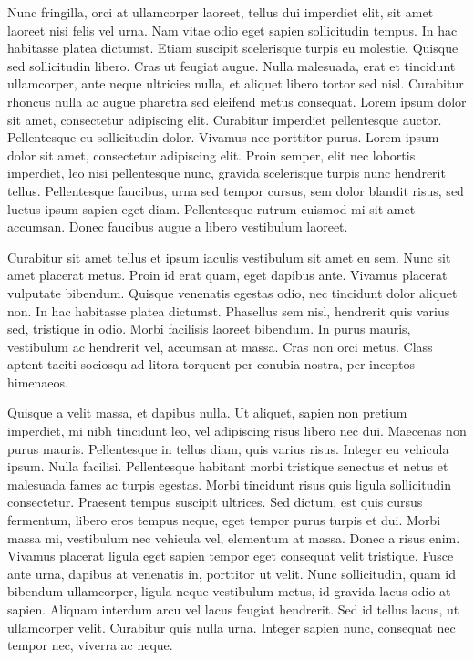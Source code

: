 Nunc fringilla, orci at ullamcorper laoreet, tellus dui imperdiet elit, sit amet laoreet nisi felis vel urna.
Nam vitae odio eget sapien sollicitudin tempus.
In hac habitasse platea dictumst.
Etiam suscipit scelerisque turpis eu molestie.
Quisque sed sollicitudin libero.
Cras ut feugiat augue.
Nulla malesuada, erat et tincidunt ullamcorper, ante neque ultricies nulla, et aliquet libero tortor sed nisl.
Curabitur rhoncus nulla ac augue pharetra sed eleifend metus consequat.
Lorem ipsum dolor sit amet, consectetur adipiscing elit.
Curabitur imperdiet pellentesque auctor.
Pellentesque eu sollicitudin dolor.
Vivamus nec porttitor purus.
Lorem ipsum dolor sit amet, consectetur adipiscing elit.
Proin semper, elit nec lobortis imperdiet, leo nisi pellentesque nunc, gravida scelerisque turpis nunc hendrerit tellus.
Pellentesque faucibus, urna sed tempor cursus, sem dolor blandit risus, sed luctus ipsum sapien eget diam.
Pellentesque rutrum euismod mi sit amet accumsan.
Donec faucibus augue a libero vestibulum laoreet.

Curabitur sit amet tellus et ipsum iaculis vestibulum sit amet eu sem.
Nunc sit amet placerat metus.
Proin id erat quam, eget dapibus ante.
Vivamus placerat vulputate bibendum.
Quisque venenatis egestas odio, nec tincidunt dolor aliquet non.
In hac habitasse platea dictumst.
Phasellus sem nisl, hendrerit quis varius sed, tristique in odio.
Morbi facilisis laoreet bibendum.
In purus mauris, vestibulum ac hendrerit vel, accumsan at massa.
Cras non orci metus.
Class aptent taciti sociosqu ad litora torquent per conubia nostra, per inceptos himenaeos.

Quisque a velit massa, et dapibus nulla.
Ut aliquet, sapien non pretium imperdiet, mi nibh tincidunt leo, vel adipiscing risus libero nec dui.
Maecenas non purus mauris.
Pellentesque in tellus diam, quis varius risus.
Integer eu vehicula ipsum.
Nulla facilisi.
Pellentesque habitant morbi tristique senectus et netus et malesuada fames ac turpis egestas.
Morbi tincidunt risus quis ligula sollicitudin consectetur.
Praesent tempus suscipit ultrices.
Sed dictum, est quis cursus fermentum, libero eros tempus neque, eget tempor purus turpis et dui.
Morbi massa mi, vestibulum nec vehicula vel, elementum at massa.
Donec a risus enim.
Vivamus placerat ligula eget sapien tempor eget consequat velit tristique.
Fusce ante urna, dapibus at venenatis in, porttitor ut velit.
Nunc sollicitudin, quam id bibendum ullamcorper, ligula neque vestibulum metus, id gravida lacus odio at sapien.
Aliquam interdum arcu vel lacus feugiat hendrerit.
Sed id tellus lacus, ut ullamcorper velit.
Curabitur quis nulla urna.
Integer sapien nunc, consequat nec tempor nec, viverra ac neque.

